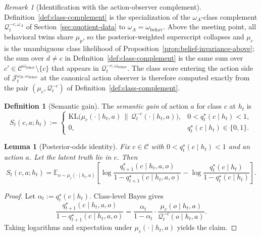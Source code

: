 \documentclass[11pt]{article}
\newtheorem{lemma}[theorem]{Lemma}
\theoremstyle{definition}
\newtheorem{definition}[theorem]{Definition}
\theoremstyle{remark}
\newtheorem{remark}[theorem]{Remark}
\newcommand{\Ccal}{\mathcal{C}}
\newcommand{\Qcal}{\mathcal{Q}}
\newcommand{\E}{\mathbb{E}}
\newcommand{\KL}{\mathrm{KL}}
\begin{document}
\begin{remark}[Identification with the action-observer complement]
\label{rem:class-complement-is-omega-behav}
Definition~\ref{def:class-complement} is the specialization of the $\omega_A$-class complement $\Qcal_t^{-c,\omega_A}$ of Section~\ref{sec:quotient-data} to $\omega_A=\omega_{\mathrm{behav}}$. Above the meeting point, all behavioral twins share $\mu_p$, so the posterior-weighted superscript collapses and $\mu_c$ is the unambiguous class likelihood of Proposition~\ref{prop:belief-invariance-above}; the sum over $d\neq c$ in Definition~\ref{def:class-complement} is the same sum over $c'\in\Ccal^{\omega_{\mathrm{behav}}}\setminus\{c\}$ that appears in $\Qcal_t^{-c,\omega_{\mathrm{behav}}}$. The class score entering the action side of $\mathcal J_t^{\omega_B,\omega_{\mathrm{behav}}}$ at the canonical action observer is therefore computed exactly from the pair $(\mu_c,\Qcal_t^{-c})$ of Definition~\ref{def:class-complement}.
\end{remark}

\begin{definition}[Semantic gain]
\label{def:semantic-gain}
The \emph{semantic gain} of action $a$ for class $c$ at $h_t$ is
\[
S_t(c,a;h_t)
:=
\begin{cases}
\KL\!\bigl(\mu_c(\cdot\mid h_t,a)\,\|\,\Qcal_t^{-c}(\cdot\mid h_t,a)\bigr), & 0<q_t^\star(c\mid h_t)<1,\\
0, & q_t^\star(c\mid h_t)\in\{0,1\}.
\end{cases}
\]
\end{definition}

\begin{lemma}[Posterior-odds identity]
\label{lem:odds-identity}
Fix $c\in\Ccal$ with $0<q_t^\star(c\mid h_t)<1$ and an action $a$. Let the latent truth lie in $c$. Then
\[
S_t(c,a;h_t)
=
\E_{o\sim\mu_c(\cdot\mid h_t,a)}\!\left[
\log\frac{q_{t+1}^\star(c\mid h_t,a,o)}{1-q_{t+1}^\star(c\mid h_t,a,o)}
-\log\frac{q_t^\star(c\mid h_t)}{1-q_t^\star(c\mid h_t)}
\right].
\]
\end{lemma}

\begin{proof}
Let $\alpha_t:=q_t^\star(c\mid h_t)$. Class-level Bayes gives
\[
\frac{q_{t+1}^\star(c\mid h_t,a,o)}{1-q_{t+1}^\star(c\mid h_t,a,o)}
=
\frac{\alpha_t}{1-\alpha_t}\cdot\frac{\mu_c(o\mid h_t,a)}{\Qcal_t^{-c}(o\mid h_t,a)}.
\]
Taking logarithms and expectation under $\mu_c(\cdot\mid h_t,a)$ yields the claim.
\end{proof}
\end{document}
